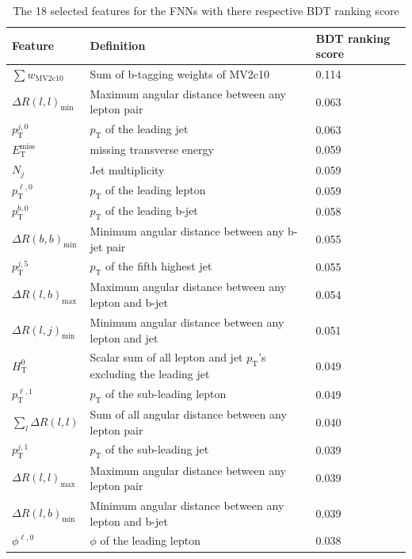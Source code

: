 \begin{table}[H]
\begin{tabular}{|l|l|l|}
\toprule
Feature & Definition & BDT ranking score \\
\midrule \midrule
$\sum w_{\text{MV2c10}}$ & Sum of b-tagging weights of MV2c10 & 0.114 \\
$\Delta R(l,l)_{\text{min}}$ & Maximum angular distance between any lepton pair & 0.063 \\
$p_{\text{T}}^{j,0}$ & $p_{\text{T}}$ of the leading jet & 0.063 \\
$E_{\text{T}}^{\text{miss}}$ & missing transverse energy & 0.059 \\
$N_j$ & Jet multiplicity & 0.059 \\
$p_{\text{T}}^{\ell,0}$ & $p_{\text{T}}$ of the leading lepton & 0.059 \\
$p_{\text{T}}^{b,0}$ & $p_{\text{T}}$ of the leading b-jet & 0.058 \\
$\Delta R(b,b)_{\text{min}}$ & Minimum angular distance between any b-jet pair & 0.055 \\
$p_{\text{T}}^{j,5}$ & $p_{\text{T}}$ of the fifth highest jet & 0.055 \\
$\Delta R(l,b)_{\text{max}}$ & Maximum angular distance between any lepton and b-jet & 0.054 \\
$\Delta R(l,j)_{\text{min}}$ & Minimum angular distance between any lepton and jet & 0.051 \\
$H_{\text{T}}^{0}$ & Scalar sum of all lepton and jet $p_{\text{T}}$'s excluding the leading jet & 0.049 \\
$p_{\text{T}}^{\ell,1}$ & $p_{\text{T}}$ of the sub-leading lepton & 0.049 \\
$\sum_l \Delta R(l,l)$ & Sum of all angular distance between any lepton pair & 0.040 \\
$p_{\text{T}}^{j,1}$ & $p_{\text{T}}$ of the sub-leading jet & 0.039 \\
$\Delta R(l,l)_{\text{max}}$ & Maximum angular distance between any lepton pair & 0.039 \\
$\Delta R(l,b)_{\text{min}}$ & Minimum angular distance between any lepton and b-jet & 0.039 \\
$\phi^{\ell,0}$ & $\phi$ of the leading lepton & 0.038 \\
\bottomrule
\end{tabular}
\caption{The 18 selected features for the FNNs with there respective BDT ranking score}
\label{tab:feature_selection}
\end{table}



